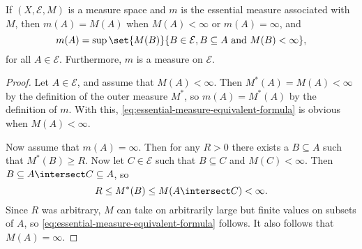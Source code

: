 \documentclass[article, a4paper, 11pt, oneside]{memoir}
\numberwithin{equation}{chapter}
\newcommand{\calE}{\mathcal{E}}
\begin{document}
\begin{lemma}
    \label{thm:essential-measure-equivalent-formula}
    If $(X,\calE,M)$ is a measure space and $m$ is the essential measure associated with $M$, then $m(A) = M(A)$ when $M(A) < \infty$ or $m(A) = \infty$, and
    \begin{equation}
        \label{eq:essential-measure-equivalent-formula}
        m(A)
            = \sup \set{ M(B) }{ B \in \calE, B \subseteq A \text{ and } M(B) < \infty },
    \end{equation}
    for all $A \in \calE$. Furthermore, $m$ is a measure on $\calE$.
\end{lemma}

\begin{proof}
    Let $A \in \calE$, and assume that $M(A) < \infty$. Then $M^*(A) = M(A) < \infty$ by the definition of the outer measure $M^*$, so $m(A) = M^*(A)$ by the definition of $m$. With this, \eqref{eq:essential-measure-equivalent-formula} is obvious when $M(A) < \infty$.

    Now assume that $m(A) = \infty$. Then for any $R > 0$ there exists a $B \subseteq A$ such that $M^*(B) \geq R$. Now let $C \in \calE$ such that $B \subseteq C$ and $M(C) < \infty$. Then $B \subseteq A \intersect C \subseteq A$, so
    \begin{equation*}
        R
            \leq M^*(B)
            \leq M(A \intersect C)
            < \infty.
    \end{equation*}
    Since $R$ was arbitrary, $M$ can take on arbitrarily large but finite values on subsets of $A$, so \eqref{eq:essential-measure-equivalent-formula} follows. It also follows that $M(A) = \infty$.


\end{proof}
\end{document}
